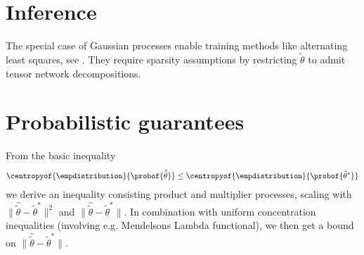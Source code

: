 \documentclass[aps,onecolumn,nofootinbib,pra]{article}
\newcommand{\slopevec}{\tilde{\theta}}
\begin{document}
    \section{Inference}

    The special case of Gaussian processes enable training methods like alternating least squares, see \cite{goessmann_uniform_2021}.
    They require sparsity assumptions by restricting $\slopevec$ to admit tensor network decompositions.

    \section{Probabilistic guarantees}

    From the basic inequality
    \begin{align*}
        \centropyof{\empdistribution}{\probof{\hat{\slopevec}}}
        \leq
        \centropyof{\empdistribution}{\probof{\slopevec^*}}
    \end{align*}
    we derive an inequality consisting product and multiplier processes, scaling with $\|\hat{\slopevec}-\slopevec^*\|^2$ and $\|\hat{\slopevec}-\slopevec^*\|$.
    In combination with uniform concentration inequalities (involving e.g. Mendelsons Lambda functional), we then get a bound on $\|\hat{\slopevec}-\slopevec^*\|$.



    
    
\end{document}
